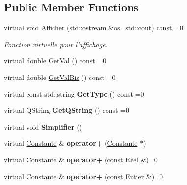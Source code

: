 \subsection*{Public Member Functions}
\begin{DoxyCompactItemize}
\item 
virtual void \hyperlink{class_constante_af3be055efee6c5be81ed6a610dbe2082}{Afficher} (std\-::ostream \&os=std\-::cout) const =0
\begin{DoxyCompactList}\small\item\em Fonction virtuelle pour l'affichage. \end{DoxyCompactList}\item 
virtual double \hyperlink{class_constante_af88eb444ed659cc6bb2f9571326a9eb1}{Get\-Val} () const =0
\item 
virtual double \hyperlink{class_constante_aa0602d62c04f28f7bda68723f5dbc48b}{Get\-Val\-Bis} () const =0
\item 
\hypertarget{class_constante_a2f716a85b9b519b7bbf8ed8d997f66d3}{virtual const std\-::string {\bfseries Get\-Type} () const =0}\label{class_constante_a2f716a85b9b519b7bbf8ed8d997f66d3}

\item 
\hypertarget{class_constante_a7c3edb9082492c95eb319da3d42bb7a4}{virtual Q\-String {\bfseries Get\-Q\-String} () const =0}\label{class_constante_a7c3edb9082492c95eb319da3d42bb7a4}

\item 
\hypertarget{class_constante_a19f83499c795b8fc069eb18600d4150b}{virtual void {\bfseries Simplifier} ()}\label{class_constante_a19f83499c795b8fc069eb18600d4150b}

\item 
\hypertarget{class_constante_a2346d7608b9732c34f96d01bed7de6c1}{virtual \hyperlink{class_constante}{Constante} \& {\bfseries operator+} (\hyperlink{class_constante}{Constante} $\ast$)}\label{class_constante_a2346d7608b9732c34f96d01bed7de6c1}

\item 
\hypertarget{class_constante_adb952a391e582f997a96d848e461e281}{virtual \hyperlink{class_constante}{Constante} \& {\bfseries operator+} (const \hyperlink{class_reel}{Reel} \&)=0}\label{class_constante_adb952a391e582f997a96d848e461e281}

\item 
\hypertarget{class_constante_a2402e4cd1b0d9d9618f05fe5876f090f}{virtual \hyperlink{class_constante}{Constante} \& {\bfseries operator+} (const \hyperlink{class_entier}{Entier} \&)=0}\label{class_constante_a2402e4cd1b0d9d9618f05fe5876f090f}


\end{DoxyCompactItemize}
